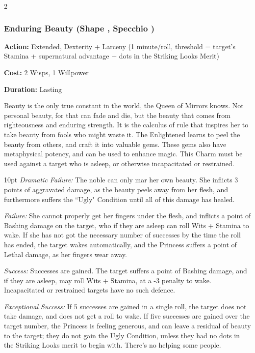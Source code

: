 \begin{multicols}{2}
\subsubsection*{Enduring Beauty (Shape \textbullet\textbullet\textbullet\textbullet, Specchio \textbullet\textbullet\textbullet\textbullet)}

\noindent \textbf{Action:} Extended, Dexterity + Larceny (1 minute/roll, threshold = target's Stamina + supernatural advantage + dots in the Striking Looks Merit)

\noindent \textbf{Cost:} 2 Wisps, 1 Willpower

\noindent \textbf{Duration:} Lasting

Beauty is the only true constant in the world, the Queen of Mirrors knows. Not personal beauty, for that can fade and die, but the beauty that comes from righteousness and enduring strength. It is the calculus of rule that inspires her to take beauty from fools who might waste it. The Enlightened learns to peel the beauty from others, and craft it into valuable gems. These gems also have metaphysical potency, and can be used to enhance magic. This Charm must be used against a target who is asleep, or otherwise incapacitated or restrained.

\begin{myindentpar}{10pt}    \emph{Dramatic Failure:} The noble can only mar her own beauty. She inflicts 3 points of aggravated damage, as the beauty peels away from her flesh, and furthermore suffers the \textquotedblleft Ugly" Condition until all of this damage has healed.

    \emph{Failure:} She cannot properly get her fingers under the flesh, and inflicts a point of Bashing damage on the target, who if they are asleep can roll Wits + Stamina to wake. If she has not got the necessary number of successes by the time the roll has ended, the target wakes automatically, and the Princess suffers a point of Lethal damage, as her fingers wear away.

    \emph{Success:} Successes are gained. The target suffers a point of Bashing damage, and if they are asleep, may roll Wits + Stamina, at a -3 penalty to wake. Incapacitated or restrained targets have no such defence.

    \emph{Exceptional Success:} If 5 successes are gained in a single roll, the target does not take damage, and does not get a roll to wake. If five successes are gained over the target number, the Princess is feeling generous, and can leave a residual of beauty to the target; they do not gain the Ugly Condition, unless they had no dots in the Striking Looks merit to begin with. There's no helping some people.\end{myindentpar}


\end{multicols}
